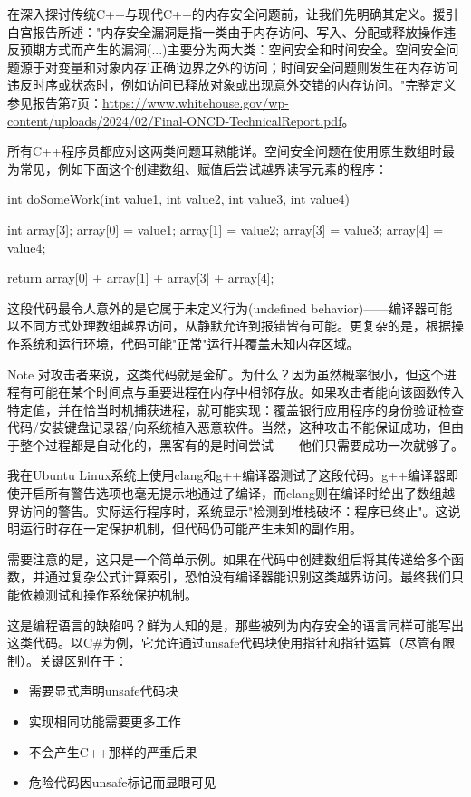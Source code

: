 
在深入探讨传统C++与现代C++的内存安全问题前，让我们先明确其定义。援引白宫报告所述："内存安全漏洞是指一类由于内存访问、写入、分配或释放操作违反预期方式而产生的漏洞(...)主要分为两大类：空间安全和时间安全。空间安全问题源于对变量和对象内存'正确'边界之外的访问；时间安全问题则发生在内存访问违反时序或状态时，例如访问已释放对象或出现意外交错的内存访问。"完整定义参见报告第7页：\url{https://www.whitehouse.gov/wp-content/uploads/2024/02/Final-ONCD-TechnicalReport.pdf}。

所有C++程序员都应对这两类问题耳熟能详。空间安全问题在使用原生数组时最为常见，例如下面这个创建数组、赋值后尝试越界读写元素的程序：

\begin{cpp}
int doSomeWork(int value1, int value2, int value3, int value4) {
  int array[3];
  array[0] = value1;
  array[1] = value2;
  array[3] = value3;
  array[4] = value4;

  return array[0] + array[1] + array[3] + array[4];
}
\end{cpp}

这段代码最令人意外的是它属于未定义行为(undefined behavior)——编译器可能以不同方式处理数组越界访问，从静默允许到报错皆有可能。更复杂的是，根据操作系统和运行环境，代码可能"正常"运行并覆盖未知内存区域。

\begin{myNotic}{Note}
对攻击者来说，这类代码就是金矿。为什么？因为虽然概率很小，但这个进程有可能在某个时间点与重要进程在内存中相邻存放。如果攻击者能向该函数传入特定值，并在恰当时机捕获进程，就可能实现：覆盖银行应用程序的身份验证检查代码/安装键盘记录器/向系统植入恶意软件。当然，这种攻击不能保证成功，但由于整个过程都是自动化的，黑客有的是时间尝试——他们只需要成功一次就够了。
\end{myNotic}

我在Ubuntu Linux系统上使用clang和g++编译器测试了这段代码。g++编译器即使开启所有警告选项也毫无提示地通过了编译，而clang则在编译时给出了数组越界访问的警告。实际运行程序时，系统显示"检测到堆栈破坏：程序已终止"。这说明运行时存在一定保护机制，但代码仍可能产生未知的副作用。

需要注意的是，这只是一个简单示例。如果在代码中创建数组后将其传递给多个函数，并通过复杂公式计算索引，恐怕没有编译器能识别这类越界访问。最终我们只能依赖测试和操作系统保护机制。

这是编程语言的缺陷吗？鲜为人知的是，那些被列为内存安全的语言同样可能写出这类代码。以C\#为例，它允许通过unsafe代码块使用指针和指针运算（尽管有限制）。关键区别在于：

\begin{itemize}
\item 
需要显式声明unsafe代码块

\item 
实现相同功能需要更多工作

\item 
不会产生C++那样的严重后果

\item 
危险代码因unsafe标记而显眼可见
\end{itemize}

